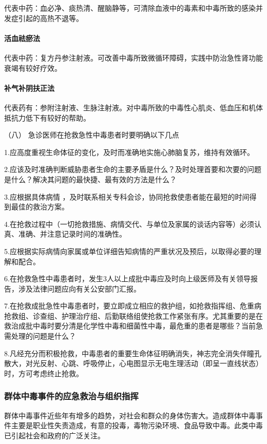 代表中药：血必净、痰热清、醒脑静等，可清除血液中的毒素和中毒所致的感染并发症引起的高热不退等。

\paragraph{活血祛瘀法}

代表中药：复方丹参注射液。可改善中毒所致微循环障碍，实践中防治急性肾功能衰竭有较好疗效。

\paragraph{补气补阴扶正法}

代表药有：参附注射液、生脉注射液。对中毒所致的中毒性心肌炎、低血压和机体抵抗力低下有较好的帮助。

\hypertarget{text00130.htmlux5cux23CHP5-1-3-2-8}{}
（八） 急诊医师在抢救急性中毒患者时要明确以下几点

1.应高度重视生命体征的变化，及时而准确地实施心肺脑复苏，维持有效循环。

2.应该及时准确判断威胁患者生命的主要矛盾是什么？及时处理首要和次要的问题是什么？解决其问题的最快捷、最有效的方法是什么？

3.应根据具体病情
，及时联系相关专科会诊，协同抢救使患者能在最短的时间得到最佳的救治方案。

4.在抢救过程中（一切抢救措施、病情交代、与单位及家属的谈话内容等）必须认真、准确、并注意记录时间的准确性。

5.应根据实际病情向家属或单位详细告知病情的严重状况及预后，以取得必要的理解和配合。

6.在抢救急性中毒患者时，发生3人以上成批中毒应及时向上级医师及有关领导报告，涉及法律问题应向有关公安部门汇报。

7.在抢救成批急性中毒患者时，要立即成立相应的救护组，如抢救指挥组、危重病抢救组、诊查组、护理治疗组、后勤联络组使抢救工作紧张有序。尤其重要的是在救治成批中毒时要分清是化学性中毒和细菌性中毒，最危重的患者是哪些？当前急需处理的问题是什么？

8.凡经充分而积极抢救，中毒患者的重要生命体征明确消失，神志完全消失伴瞳孔散大，对光反射、心跳、呼吸停止，心电图显示无电生理活动（即呈一直线状态）时，方可考虑终止抢救。

\subsubsection{群体中毒事件的应急救治与组织指挥}

群体中毒事件近些年有增多的趋势，对社会和群众的身体伤害大。造成群体中毒事件主要是职业性失责造成，有意的投毒，毒物污染环境、食品导致中毒。此类中毒已引起社会和政府的广泛关注。

